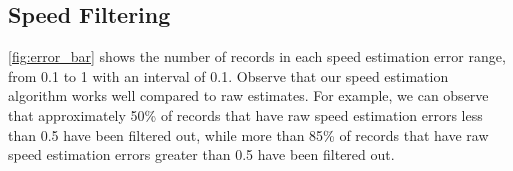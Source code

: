 \subsection{Speed Filtering}

\autoref{fig:error_bar} shows the number of records in each speed estimation error range, from 0.1 to 1 with an interval of 0.1. Observe that our speed estimation algorithm works well compared to raw estimates. For example, we can observe that approximately 50\% of records that have raw speed estimation errors less than 0.5 have been filtered out, while more than 85\% of records that have raw speed estimation errors greater than 0.5 have been filtered out.
